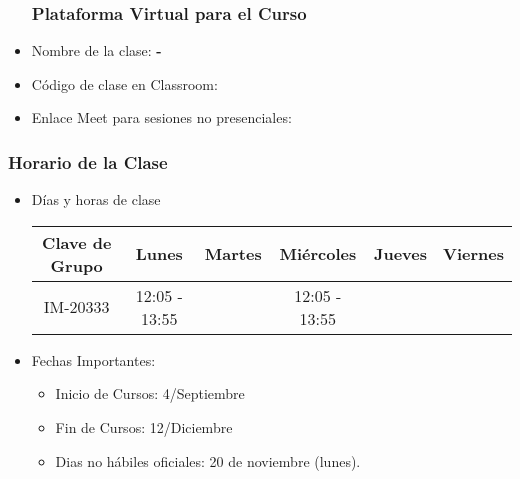 
\begin{frame}
\begin{itemize}
\frametitle{Plataforma Virtual para el Curso}
\item Nombre de la clase: \textbf{\nombreMateria-\cuatrimestre}
\item Código de clase en Classroom: \textbf{\claveClassroom}
\item Enlace Meet para sesiones no presenciales: \textbf{\claveMeet}
\end{itemize}
\end{frame}

\begin{frame}
\frametitle{Horario de la Clase}


\begin{itemize}
\item Días y horas de clase
\tiny
\begin{spacing}{1.0}
\begin{center}
\begin{tabular}{c|ccccc}
\hline 
\textbf{Clave de Grupo}          & Lunes           & Martes       & Miércoles      & Jueves          & Viernes        \\  \hline 
IM-20333  & 12:05 - 13:55   &              & 12:05 - 13:55  &                 &                \\
\hline
\end{tabular}
\end{center}
\end{spacing}
\normalsize
\item Fechas Importantes:
\begin{itemize}
\item Inicio de Cursos: 4/Septiembre
\item Fin de Cursos: 12/Diciembre
\item Dias no hábiles oficiales: 20 de noviembre (lunes). 
\end{itemize}
\end{itemize}

\end{frame}


